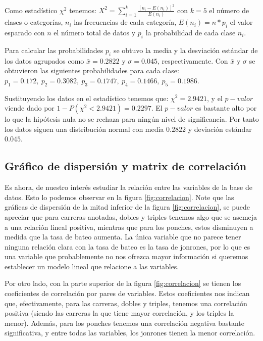 \documentclass{staprojteamusb}
\begin{document}
 Como estadístico \(\chi^{2}\) tenemos: \(\displaystyle X^{2}=\sum_{i=1}^{k}\frac{[n_{i}-E(n_{i})]^{2}}{E(n_{i})}\)
 con \(k=5\) el número de clases o categorías, \(n_{i}\) las frecuencias de cada categoría, \(E(n_{i})=n*p_{i}\) el valor esparado con \(n\) el número total de datos y \(p_{i}\) la probabilidad de cada clase \(n_{i}\).

 Para calcular las probabilidades \(p_{i}\) se obtuvo la media y la desviación estándar de los datos agrupados como \(\bar{x}=0.2822\) y \(\sigma=0.045\), respectivamente. Con \(\bar{x}\) y \(\sigma\) se obtuvieron las siguientes probabilidades para cada clase: \(p_{1}=0.172,\ p_{2}=0.3082,\ p_{3}= 0.1747,\ p_{4}= 0.1466,\ p_{5}= 0.1986\).

 Sustituyendo los datos en el estadístico tenemos que: \(\chi^{2}=2.9421\), y el \(p-valor\) viende dado por \(1-P(\chi^{2}<2.9421)=0.2297\). El \(p-valor\) es bastante alto por lo que la hipótesis nula no se rechaza para ningún nivel de significancia. Por tanto los datos siguen una distribución normal con media \(0.2822\) y deviación estándar \(0.045\).

 \hypertarget{gruxe1fico-de-dispersiuxf3n-y-matrix-de-correlaciuxf3n}{%
 \subsection{Gráfico de dispersión y matrix de correlación}\label{gruxe1fico-de-dispersiuxf3n-y-matrix-de-correlaciuxf3n}}

 Es ahora, de nuestro interés estudiar la relación entre las variables de la base de datos. Esto lo podemos observar en la figura \ref{fig:correlacion}. Note que las gráficas de dispersión de la mitad inferior de la figura \ref{fig:correlacion}, se puede apreciar que para carreras anotadas, dobles y triples tenemos algo que se asemeja a una relación lineal positiva, mientras que para los ponches, estos disminuyen a medida que la tasa de bateo aumenta. La única variable que no parece tener ninguna relación clara con la tasa de bateo es la tasa de jonrones, por lo que es una variable que probablemente no nos ofrezca mayor información si queremos establecer un modelo lineal que relacione a las variables.

 Por otro lado, con la parte superior de la figura \ref{fig:correlacion} se tienen los coeficientes de correlación por pares de variables. Estos coeficientes nos indican que, efectivamente, para las carreras, dobles y triples, tenemos una correlación positiva (siendo las carreras la que tiene mayor correlación, y los triples la menor). Además, para los ponches tenemos una correlación negativa bastante significativa, y entre todas las variables, los jonrones tienen la menor correlación.
\end{document}
